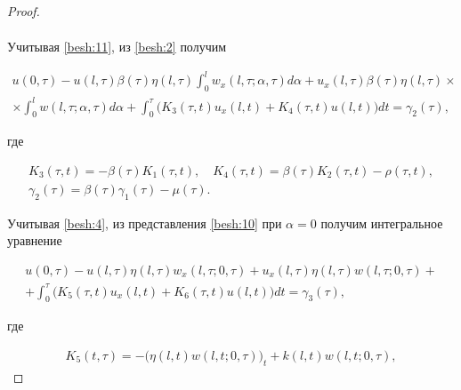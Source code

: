 \begin{proof}
\begin{multline*}
\end{multline*}



Учитывая \eqref{besh:11}, из \eqref{besh:2} получим

\begin{multline}

u(0,\tau)-u(l,\tau)\beta(\tau)\eta(l,\tau)\int^{l}_{0}w_{x}(l,\tau;\alpha,\tau)d\alpha

+u_{x}(l,\tau)\beta(\tau)\eta(l,\tau) \times \\ \times\int^{l}_{0}w(l,\tau;\alpha,\tau)d\alpha

+\int^{\tau}_0\Big(

K_{3}(\tau,t)u_{x}(l,t)+K_{4}(\tau,t)u(l,t)\Big)dt=\gamma_{2}(\tau),

\label{besh:12}

\end{multline}

где

\begin{gather*}

K_{3}(\tau,t)=-\beta(\tau)K_{1}(\tau,t),

\quad 

K_{4}(\tau,t)=\beta(\tau)K_{2}(\tau,t)-\rho(\tau,t),

\\

\gamma_{2}(\tau)=\beta(\tau)\gamma_{1}(\tau)-\mu(\tau).

\end{gather*}



Учитывая \eqref{besh:4}, из представления \eqref{besh:10} при $\alpha=0$ получим интегральное уравнение

\begin{multline}

u(0,\tau)-u(l,\tau)\eta(l,\tau)w_{x}(l,\tau;0,\tau)

+u_{x}(l,\tau)\eta(l,\tau)w(l,\tau;0,\tau) +

\\

+\int^{\tau}_0\Big(K_{5}(\tau,t)u_{x}(l,t)+K_{6}(\tau,t)u(l,t)\Big)dt=\gamma_{3}(\tau),

\label{besh:13}

\end{multline}

где

\begin{gather*}

K_{5}(t,\tau)=-\big(\eta(l,t)w(l,t;0,\tau)\big)_{t}+k(l,t)w(l,t;0,\tau),


\end{gather*}
\end{proof}

